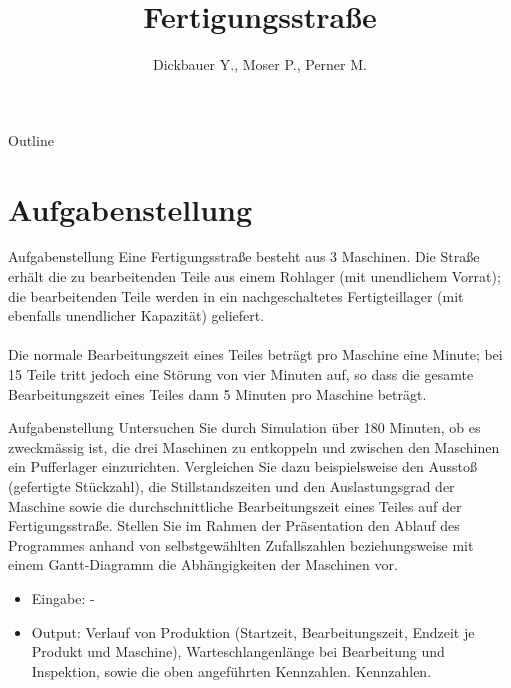

\title[BSP23 - Fertigungsstraße]{Fertigungsstraße}
\author{Dickbauer Y., Moser P., Perner M.}



\begin{frame}
  \titlepage
\end{frame}

\begin{frame}{Outline}
  \tableofcontents
\end{frame}

\section{Aufgabenstellung}
\begin{frame}{Aufgabenstellung}
Eine Fertigungsstraße besteht aus 3 Maschinen. Die Straße erhält die zu bearbeitenden
Teile aus einem Rohlager (mit unendlichem Vorrat); die bearbeitenden Teile werden in
ein nachgeschaltetes Fertigteillager (mit ebenfalls unendlicher Kapazität) geliefert.\\~\\
Die normale Bearbeitungszeit eines Teiles beträgt pro Maschine eine Minute; bei 15%
Teile tritt jedoch eine Störung von vier Minuten auf, so dass die gesamte Bearbeitungszeit
eines Teiles dann 5 Minuten pro Maschine beträgt.
\end{frame}

\begin{frame}{Aufgabenstellung}
Untersuchen Sie durch Simulation über 180 Minuten, ob es zweckmässig ist, die drei
Maschinen zu entkoppeln und zwischen den Maschinen ein Pufferlager einzurichten. Vergleichen
Sie dazu beispielsweise den Ausstoß (gefertigte Stückzahl), die Stillstandszeiten
und den Auslastungsgrad der Maschine sowie die durchschnittliche Bearbeitungszeit eines
Teiles auf der Fertigungsstraße. Stellen Sie im Rahmen der Präsentation den Ablauf
des Programmes anhand von selbstgewählten Zufallszahlen beziehungsweise mit einem
Gantt-Diagramm die Abhängigkeiten der Maschinen vor.
\begin{itemize}
  \item Eingabe: -
  \item Output: Verlauf von Produktion (Startzeit, Bearbeitungszeit, Endzeit je Produkt
und Maschine), Warteschlangenlänge bei Bearbeitung und Inspektion, sowie die
oben angeführten Kennzahlen.
Kennzahlen.
\end{itemize}
\end{frame}

